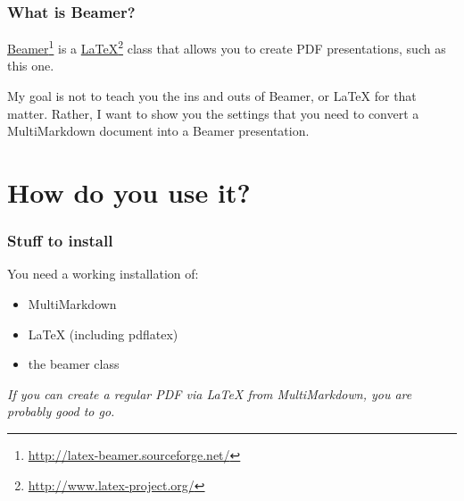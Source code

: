 \begin{frame}

\frametitle{What is Beamer?}
\label{whatisbeamer}

\href{http://latex-beamer.sourceforge.net/}{Beamer}\footnote{\href{http://latex-beamer.sourceforge.net/}{http:\slash \slash latex-beamer.sourceforge.net\slash }} is a \href{http://www.latex-project.org/}{LaTeX}\footnote{\href{http://www.latex-project.org/}{http:\slash \slash www.latex-project.org\slash }} class that allows you
to create PDF presentations, such as this one.

My goal is not to teach you the ins and outs of Beamer, or LaTeX for that
matter. Rather, I want to show you the settings that you need to convert a
MultiMarkdown document into a Beamer presentation.

\end{frame}

\section{How do you use it?}
\label{howdoyouuseit}

\begin{frame}

\frametitle{Stuff to install}
\label{stufftoinstall}

You need a working installation of:

\begin{itemize}
\item MultiMarkdown

\item LaTeX (including pdflatex)

\item the beamer class

\end{itemize}

\emph{If you can create a regular PDF via LaTeX from MultiMarkdown, you are
probably good to go.}

\end{frame}

